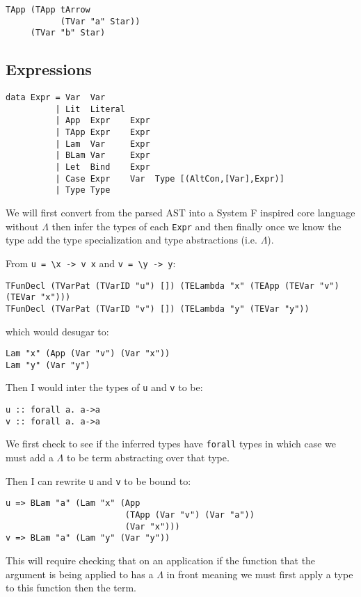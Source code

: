 \documentclass[12pt,a4paper,twoside]{article}
\begin{document}
\begin{verbatim}
TApp (TApp tArrow 
           (TVar "a" Star)) 
     (TVar "b" Star)
\end{verbatim}

\subsection{Expressions}

\begin{verbatim}
data Expr = Var  Var
          | Lit  Literal
          | App  Expr    Expr
          | TApp Expr    Expr
          | Lam  Var     Expr
          | BLam Var     Expr
          | Let  Bind    Expr
          | Case Expr    Var  Type [(AltCon,[Var],Expr)]
          | Type Type
\end{verbatim}

We will first convert from the parsed AST into a System F inspired 
core language without $\Lambda$ then infer the types of each \texttt{Expr}
and then finally once we know the type add the type specialization and
type abstractions (i.e. $\Lambda$).

From \texttt{u = \textbackslash x -> v x} and \texttt{v = \textbackslash y -> y}:
\begin{verbatim}
TFunDecl (TVarPat (TVarID "u") []) (TELambda "x" (TEApp (TEVar "v") (TEVar "x")))
TFunDecl (TVarPat (TVarID "v") []) (TELambda "y" (TEVar "y"))
\end{verbatim}
which would desugar to:
\begin{verbatim}
Lam "x" (App (Var "v") (Var "x"))
Lam "y" (Var "y")
\end{verbatim}
Then I would inter the types of \texttt{u} and \texttt{v} to be:
\begin{verbatim}
u :: forall a. a->a
v :: forall a. a->a
\end{verbatim}

We first check to see if the inferred types have \texttt{forall} types in which
case we must add a $\Lambda$ to be term abstracting over that type.

Then I can rewrite \texttt{u} and \texttt{v} to be bound to:
\begin{verbatim}
u => BLam "a" (Lam "x" (App 
                        (TApp (Var "v") (Var "a")) 
                        (Var "x")))
v => BLam "a" (Lam "y" (Var "y"))
\end{verbatim}

This will require checking that on an application if the function that the 
argument is being applied to has a $\Lambda$ in front meaning we must first 
apply a type to this function then the term.


\printbibliography
\end{document}
